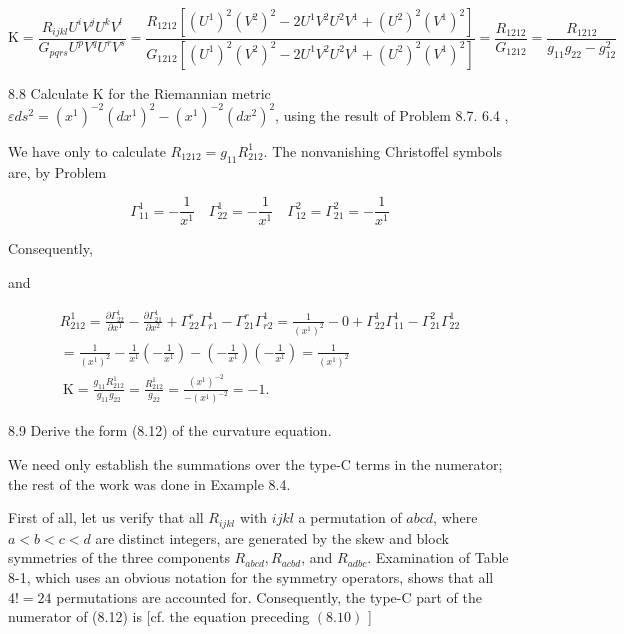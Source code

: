 \documentclass[10pt]{article}
\begin{document}
$$
\mathrm{K}=\frac{R_{i j k l} U^{i} V^{j} U^{k} V^{l}}{G_{p q r s} U^{p} V^{q} U^{r} V^{s}}=\frac{R_{1212}\left[\left(U^{1}\right)^{2}\left(V^{2}\right)^{2}-2 U^{1} V^{2} U^{2} V^{1}+\left(U^{2}\right)^{2}\left(V^{1}\right)^{2}\right]}{G_{1212}\left[\left(U^{1}\right)^{2}\left(V^{2}\right)^{2}-2 U^{1} V^{2} U^{2} V^{1}+\left(U^{2}\right)^{2}\left(V^{1}\right)^{2}\right]}=\frac{R_{1212}}{G_{1212}}=\frac{R_{1212}}{g_{11} g_{22}-g_{12}^{2}}
$$

8.8 Calculate $\mathrm{K}$ for the Riemannian metric $\varepsilon d s^{2}=\left(x^{1}\right)^{-2}\left(d x^{1}\right)^{2}-\left(x^{1}\right)^{-2}\left(d x^{2}\right)^{2}$, using the result of Problem 8.7. 6.4 ,

We have only to calculate $R_{1212}=g_{11} R_{212}^{1}$. The nonvanishing Christoffel symbols are, by Problem

$$
\Gamma_{11}^{1}=-\frac{1}{x^{1}} \quad \Gamma_{22}^{1}=-\frac{1}{x^{1}} \quad \Gamma_{12}^{2}=\Gamma_{21}^{2}=-\frac{1}{x^{1}}
$$

Consequently,

and

$$
\begin{gathered}
R_{212}^{1}=\frac{\partial \Gamma_{22}^{1}}{\partial x^{1}}-\frac{\partial \Gamma_{21}^{1}}{\partial x^{2}}+\Gamma_{22}^{r} \Gamma_{r 1}^{1}-\Gamma_{21}^{r} \Gamma_{r 2}^{1}=\frac{1}{\left(x^{1}\right)^{2}}-0+\Gamma_{22}^{1} \Gamma_{11}^{1}-\Gamma_{21}^{2} \Gamma_{22}^{1} \\
=\frac{1}{\left(x^{1}\right)^{2}}-\frac{1}{x^{1}}\left(-\frac{1}{x^{1}}\right)-\left(-\frac{1}{x^{1}}\right)\left(-\frac{1}{x^{1}}\right)=\frac{1}{\left(x^{1}\right)^{2}} \\
\mathrm{~K}=\frac{g_{11} R_{212}^{1}}{g_{11} g_{22}}=\frac{R_{212}^{1}}{g_{22}}=\frac{\left(x^{1}\right)^{-2}}{-\left(x^{1}\right)^{-2}}=-1 .
\end{gathered}
$$

8.9 Derive the form (8.12) of the curvature equation.

We need only establish the summations over the type-C terms in the numerator; the rest of the work was done in Example 8.4.

First of all, let us verify that all $R_{i j k l}$ with $i j k l$ a permutation of $a b c d$, where $a<b<c<d$ are distinct integers, are generated by the skew and block symmetries of the three components $R_{a b c d}, R_{a c b d}$, and $R_{a d b c}$. Examination of Table 8-1, which uses an obvious notation for the symmetry operators, shows that all $4 !=24$ permutations are accounted for. Consequently, the type-C part of the numerator of (8.12) is [cf. the equation preceding $(8.10)$ ]
\end{document}
